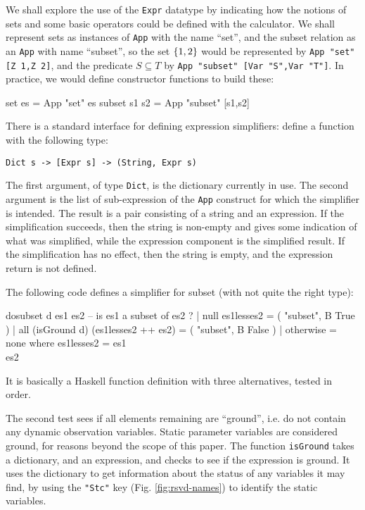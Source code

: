 We shall explore the use of the \texttt{Expr}  datatype
by indicating how the notions of sets and some basic operators
could be defined with the calculator.
We shall represent sets as instances of \texttt{App} with the name ``set'',
and the subset relation as an \texttt{App} with name ``subset'',
so the set $\{{1,2}\}$ would be represented by
\verb$App "set" [Z 1,Z 2]$,
and the predicate $S \subseteq T$ by
\verb$App "subset" [Var "S",Var "T"]$.
In practice, we would define constructor functions to build
these:
\begin{code}
set es = App "set" es
subset s1 s2 = App "subset" [s1,s2]
\end{code}
There is a standard interface for defining expression simplifiers:
define a function with the following type:
\begin{verbatim}
Dict s -> [Expr s] -> (String, Expr s)
\end{verbatim}
The first argument, of type \texttt{Dict},
is the dictionary currently in use.
The second argument is the list of sub-expression of
the \texttt{App} construct for which the simplifier is intended.
The result is a pair consisting of a string and an expression.
If the simplification succeeds, then the string is non-empty
and gives some indication
of what was simplified,
while the expression component is the simplified result.
If the simplification has no effect, then the string is empty,
and the expression return is not defined.

The following code defines a simplifier for subset
(with not quite the right type):
\begin{code}
dosubset d es1 es2 -- is es1 a subset of es2 ?
  | null es1lesses2  =  ( "subset", B True )
  | all (isGround d) (es1lesses2 ++ es2)
                     =  ( "subset", B False )
  | otherwise        =  none
  where
    es1lesses2 = es1 \\ es2
\end{code}
It is basically a Haskell function definition with three alternatives,
tested in order.

The second test sees if all elements remaining are ``ground'',
i.e. do not contain any dynamic observation variables.
Static parameter variables are considered ground,
for reasons beyond the scope of this paper.
The function \texttt{isGround} takes a dictionary,
and an expression, and checks to see if the expression is ground.
It uses the dictionary to get information about the status
of any variables it may find, by using the \verb$"Stc"$ key
(Fig. \ref{fig:rsvd-names}) to identify the static variables.

